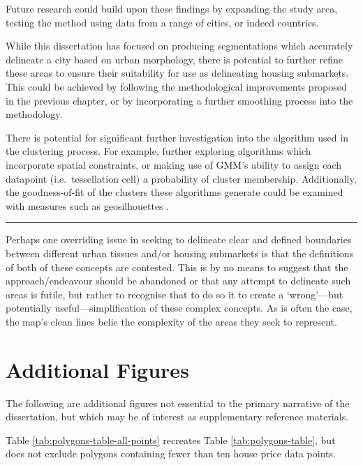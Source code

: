 \documentclass[a4paper, nobind]{templates/ociamthesis}
\begin{document}
Future research could build upon these findings by expanding the study area, testing the method using data from a range of cities, or indeed countries.

While this dissertation has focused on producing segmentations which accurately delineate a city based on urban morphology, there is potential to further refine these areas to ensure their suitability for use as delineating housing submarkets. This could be achieved by following the methodological improvements proposed in the previous chapter, or by incorporating a further smoothing process into the methodology.

There is potential for significant further investigation into the algorithm used in the clustering process. For example, further exploring algorithms which incorporate spatial constraints, or making use of GMM's ability to assign each datapoint (i.e.~tessellation cell) a probability of cluster membership. Additionally, the goodness-of-fit of the clusters these algorithms generate could be examined with measures such as geosilhouettes \citep{wolf2021}.

\begin{center}\rule{0.5\linewidth}{0.5pt}\end{center}

Perhaps one overriding issue in seeking to delineate clear and defined boundaries between different urban tissues and/or housing submarkets is that the definitions of both of these concepts are contested. This is by no means to suggest that the approach/endeavour should be abandoned or that any attempt to delineate such areas is futile, but rather to recognise that to do so it to create a `wrong'---but potentially useful---simplification of these complex concepts. As is often the case, the map's clean lines belie the complexity of the areas they seek to represent.

\startappendices

\hypertarget{additional-figures}{%
\chapter{Additional Figures}\label{additional-figures}}

The following are additional figures not essential to the primary narrative of the dissertation, but which may be of interest as supplementary reference materials.

Table \ref{tab:polygons-table-all-points} recreates Table \ref{tab:polygons-table}, but does not exclude polygons containing fewer than ten house price data points.
\end{document}
